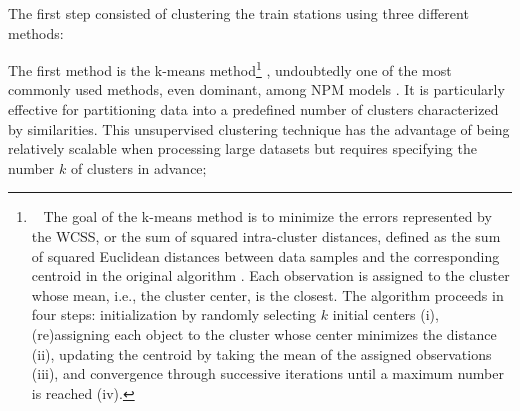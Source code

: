 \begin{refsegment}
The first step consisted of clustering the train stations using three different methods:
\begin{customitemize}
    \item The first method is the k-means method\footnote{~
        The goal of the k-means method is to minimize the errors represented by the \acrfull{WCSS}, or the sum of squared intra-cluster distances, defined as the sum of squared Euclidean distances between data samples and the corresponding centroid in the original algorithm \textcolor{blue}{\autocite[4]{barve_reef-insight_2023}}. Each observation is assigned to the cluster whose mean, i.e., the cluster center, is the closest. The algorithm proceeds in four steps: initialization by randomly selecting \(k\) initial centers (i), (re)assigning each object to the cluster whose center minimizes the distance (ii), updating the centroid by taking the mean of the assigned observations (iii), and convergence through successive iterations until a maximum number is reached (iv).
    } \textcolor{blue}{\autocite[281]{macqueen_methods_1967}}, undoubtedly one of the most commonly used methods, even dominant, among \acrshort{NPM} models \textcolor{blue}{\autocites[132]{caset_planning_2019}[12]{cao_coordination_2020}[248]{yang_tod_2021}[5]{liao_evaluating_2022}[3]{amini_pishro_integrated_2023}[628]{wei_classifying_2023}[2]{zhou_introducing_2023}}. It is particularly effective for partitioning data into a predefined number of clusters characterized by similarities. This unsupervised clustering technique has the advantage of being relatively scalable when processing large datasets but requires specifying the number \(k\) of clusters in advance;

\end{customitemize}
\end{refsegment}
